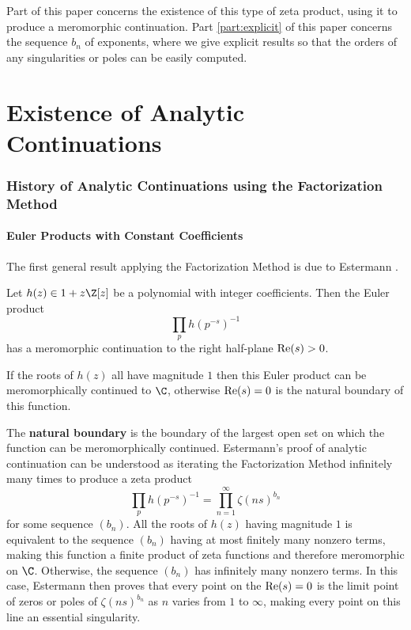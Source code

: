 \documentclass[12pt]{amsart}
\theoremstyle{plain}
\begin{document}
Part \ref{part:existence} of this paper concerns the existence of this type of zeta product, using it to produce a meromorphic continuation. Part \ref{part:explicit} of this paper concerns the sequence $b_n$ of exponents, where we give explicit results so that the orders of any singularities or poles can be easily computed.












\part{Existence of Analytic Continuations}\label{part:existence}

\section{History of Analytic Continuations using the Factorization Method}\label{sec:history}

\subsection{Euler Products with Constant Coefficients}\label{subsec:histroy_const_coef}
The first general result applying the Factorization Method is due to Estermann \cite{estermann_1928}.

\begin{theorem}\label{thm:estermann}
    Let $h(z) \in 1 + z\Z[z]$ be a polynomial with integer coefficients. Then the Euler product
    \[
    \prod_p h(p^{-s})^{-1}
    \]
    has a meromorphic continuation to the right half-plane ${\rm Re}(s)>0$.

    If the roots of $h(z)$ all have magnitude $1$ then this Euler product can be meromorphically continued to $\C$, otherwise ${\rm Re}(s) = 0$ is the natural boundary of this function.
\end{theorem}

The \textbf{natural boundary} is the boundary of the largest open set on which the function can be meromorphically continued. Estermann's proof of analytic continuation can be understood as iterating the Factorization Method infinitely many times to produce a zeta product
\[
    \prod_p h(p^{-s})^{-1} = \prod_{n=1}^\infty \zeta(ns)^{b_n}
\]
for some sequence $(b_n)$. All the roots of $h(z)$ having magnitude $1$ is equivalent to the sequence $(b_n)$ having at most finitely many nonzero terms, making this function a finite product of zeta functions and therefore meromorphic on $\C$. Otherwise, the sequence $(b_n)$ has infinitely many nonzero terms. In this case, Estermann then proves that every point on the ${\rm Re}(s)=0$ is the limit point of zeros or poles of $\zeta(ns)^{b_n}$ as $n$ varies from $1$ to $\infty$, making every point on this line an essential singularity.
\end{document}
